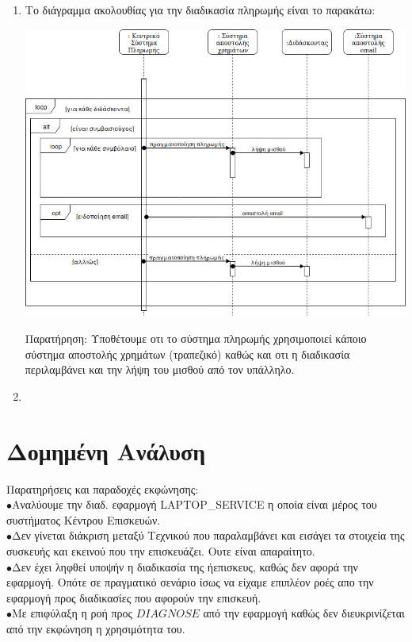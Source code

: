 \documentclass[12pt]{article}
\newcommand\tab[1][1cm]{\hspace*{#1}}
\begin{document}
\begin{enumerate}
\item
Το διάγραμμα ακολουθίας για την διαδικασία πληρωμής είναι το παρακάτω:
\begin{center}
\includegraphics[scale=0.45]{sequence}
\end{center}
\tab Παρατήρηση: Υποθέτουμε οτι το σύστημα πληρωμής χρησιμοποιεί κάποιο 
σύστημα αποστολής χρημάτων (τραπεζικό) καθώς και οτι η 
διαδικασία περιλαμβάνει και την λήψη του μισθού από τον υπάλληλο.

\item
\end{enumerate}

\newpage
\section{Δομημένη Ανάλυση}
Παρατηρήσεις και παραδοχές εκφώνησης:\\
$\bullet$Αναλύουμε την διαδ. εφαρμογή \textlatin{LAPTOP\_SERVICE} η οποία είναι μέρος του συστήματος Κέντρου Επισκευών.\\
$\bullet$Δεν γίνεται διάκριση μεταξύ Τεχνικού που παραλαμβάνει και εισάγει τα στοιχεία της συσκευής και εκεινού που την επισκευάζει. Ουτε είναι απαραίτητο.\\
$\bullet$Δεν έχει ληφθεί υποψήν η διαδικασία της ήεπισκευς, καθώς δεν αφορά την εφαρμογή. Οπότε σε πραγματικό σενάριο ίσως να είχαμε επιπλέον ροές απο την εφαρμογή προς διαδικασίες που αφορούν την επισκευή.\\
$\bullet$Με επιφύλαξη η ροή προς $DIAGNOSE$ από την εφαρμογή καθώς δεν διευκρινίζεται από την εκφώνηση η χρησιμότητα του.
\end{document}
